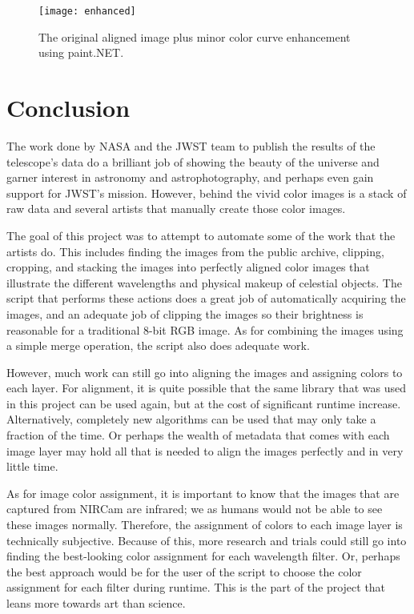 \documentclass[10pt,twocolumn,letterpaper]{article}
\begin{document}
\begin{figure}[t]
  \centering
  \texttt{[image: enhanced]}
  \caption{The original aligned image plus minor color curve enhancement using paint.NET.}
  \label{fig:enhancement}
\end{figure}

\section{Conclusion}
\label{sec:conc}

The work done by NASA and the JWST team to publish the results of the telescope's data do a brilliant job of showing the beauty of the universe and garner interest in astronomy and astrophotography, and perhaps even gain support for JWST's mission. However, behind the vivid color images is a stack of raw data and several artists that manually create those color images.

The goal of this project was to attempt to automate some of the work that the artists do. This includes finding the images from the public archive, clipping, cropping, and stacking the images into perfectly aligned color images that illustrate the different wavelengths and physical makeup of celestial objects. 
The script that performs these actions does a great job of automatically acquiring the images, and an adequate job of clipping the images so their brightness is reasonable for a traditional 8-bit RGB image. As for combining the images using a simple merge operation, the script also does adequate work.

However, much work can still go into aligning the images and assigning colors to each layer. For alignment, it is quite possible that the same library that was used in this project can be used again, but at the cost of significant runtime increase. Alternatively, completely new algorithms can be used that may only take a fraction of the time. Or perhaps the wealth of metadata that comes with each image layer may hold all that is needed to align the images perfectly and in very little time.

As for image color assignment, it is important to know that the images that are captured from NIRCam are infrared; we as humans would not be able to see these images normally. Therefore, the assignment of colors to each image layer is technically subjective. Because of this, more research and trials could still go into finding the best-looking color assignment for each wavelength filter. 
Or, perhaps the best approach would be for the user of the script to choose the color assignment for each filter during runtime. This is the part of the project that leans more towards art than science.
\end{document}
